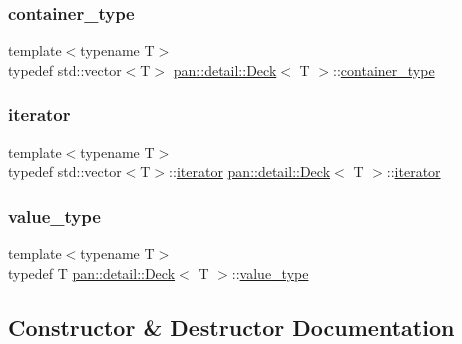 \subsubsection{\texorpdfstring{container\+\_\+type}{container\_type}}
{\footnotesize\ttfamily template$<$typename T$>$ \\
typedef std\+::vector$<$T$>$ \hyperlink{classpan_1_1detail_1_1_deck}{pan\+::detail\+::\+Deck}$<$ T $>$\+::\hyperlink{classpan_1_1detail_1_1_deck_a847d973e0469dd7aef881b3863c37cff}{container\+\_\+type}}

\mbox{\label{classpan_1_1detail_1_1_deck_a8b4adeae73d035d2bbe3fdfcb65ed1b1}} 
\subsubsection{\texorpdfstring{iterator}{iterator}}
{\footnotesize\ttfamily template$<$typename T$>$ \\
typedef std\+::vector$<$T$>$\+::\hyperlink{classpan_1_1detail_1_1_deck_a8b4adeae73d035d2bbe3fdfcb65ed1b1}{iterator} \hyperlink{classpan_1_1detail_1_1_deck}{pan\+::detail\+::\+Deck}$<$ T $>$\+::\hyperlink{classpan_1_1detail_1_1_deck_a8b4adeae73d035d2bbe3fdfcb65ed1b1}{iterator}}

\mbox{\label{classpan_1_1detail_1_1_deck_ac5564d75421f0eb701a2b0b6f4220337}} 
\subsubsection{\texorpdfstring{value\+\_\+type}{value\_type}}
{\footnotesize\ttfamily template$<$typename T$>$ \\
typedef T \hyperlink{classpan_1_1detail_1_1_deck}{pan\+::detail\+::\+Deck}$<$ T $>$\+::\hyperlink{classpan_1_1detail_1_1_deck_ac5564d75421f0eb701a2b0b6f4220337}{value\+\_\+type}}



\subsection{Constructor \& Destructor Documentation}
\mbox{\label{classpan_1_1detail_1_1_deck_a022f77a6a1618e8ab2aa938859873e96}} 
